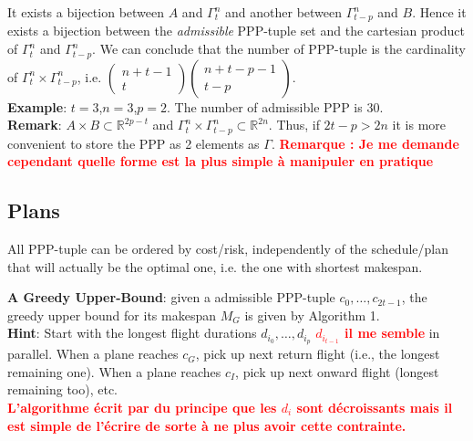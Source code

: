\documentclass[a4paper,11pt]{article}
\newcommand{\myred}[1]
{\textcolor{red}{\bf {#1}}
}
\begin{document}
It exists a bijection between $A$ and $\Gamma^{n}_{t}$ and another between $\Gamma^{n}_{t-p}$ and $B$. Hence it exists a bijection between the {\it admissible} PPP-tuple set and the cartesian product of $\Gamma^{n}_{t}$ and $\Gamma^{n}_{t-p}$. We can conclude that the number of PPP-tuple is the cardinality of $\Gamma^{n}_{t} \times \Gamma^{n}_{t-p}$, i.e. $\begin{pmatrix}
n+t-1\\
t
\end{pmatrix}
\begin{pmatrix}
n+t-p-1\\
t-p
\end{pmatrix}$.\\

{\bf Example}: $t=3$,$n=3$,$p=2$. The number of admissible PPP is 30.\\

{\bf Remark}: $A\times B \subset \mathbb{R}^{2p-t}$ and $\Gamma^{n}_{t} \times \Gamma^{n}_{t-p} \subset \mathbb{R}^{2n}$. Thus, if $2t-p > 2n$ it is more convenient to store the PPP as 2 elements as $\Gamma$. \myred{Remarque : Je me demande cependant quelle forme est la plus simple à manipuler en pratique}

\subsection{Plans}
All PPP-tuple can be ordered by cost/risk, independently of the schedule/plan that will actually be the optimal one, i.e. the one with shortest makespan.

\noindent
{\bf A Greedy Upper-Bound}: given a admissible PPP-tuple $c_0, \ldots, c_{2t-1}$, the greedy upper bound for its makespan $M_G$ is given by Algorithm 1.\\
{\bf Hint}: Start with the longest flight durations $d_{i_0}, \ldots, d_{i_p}$ \myred{$d_{i_{t-1}}$ il me semble} in parallel. When a plane reaches $c_G$, pick up next return flight (i.e., the longest remaining one). When a plane reaches $c_I$, pick up next onward flight (longest remaining too), etc.\\

\myred{L'algorithme écrit par du principe que les $d_i$ sont décroissants mais il est simple de l'écrire de sorte à ne plus avoir cette contrainte.}
\end{document}
